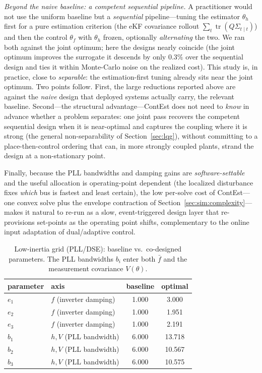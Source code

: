 \documentclass[twocolumn,amsthm]{autart}
\begin{document}
\emph{Beyond the naive baseline: a competent sequential pipeline.} A practitioner
would not use the uniform baseline but a \emph{sequential} pipeline---tuning the
estimator $\theta_h$ first for a pure estimation criterion (the eKF covariance
rollout $\sum_t\operatorname{tr}(Q\Sigma_{t\mid t})$) and then the control $\theta_f$
with $\theta_h$ frozen, optionally \emph{alternating} the two. We ran both against the
joint optimum; here the designs nearly coincide (the joint optimum improves the
surrogate it descends by only $0.3\%$ over the sequential design and ties it within
Monte-Carlo noise on the realized cost). This study is, in practice, close to
\emph{separable}: the estimation-first tuning already sits near the joint optimum. Two
points follow. First, the large reductions reported above are against the \emph{naive}
design that deployed systems actually carry, the relevant baseline. Second---the
structural advantage---ContEst does not need to \emph{know} in advance whether a
problem separates: one joint pass recovers the competent sequential design when it is
near-optimal and captures the coupling where it is strong (the general
non-separability of Section~\ref{sec:lqg}), without committing to a place-then-control
ordering that can, in more strongly coupled plants, strand the design at a
non-stationary point.

Finally, because the PLL bandwidths and damping gains are \emph{software-settable}
and the useful allocation is operating-point dependent (the localized disturbance
fixes \emph{which} bus is fastest and least certain), the low per-solve cost of
ContEst---one convex solve plus the envelope contraction of
Section~\ref{sec:sim:complexity}---makes it natural to re-run as a slow,
event-triggered design layer that re-provisions set-points as the operating point
shifts, complementary to the online input adaptation of dual/adaptive control.

\begin{table}[t]
\centering
\caption{Low-inertia grid (PLL/DSE): baseline vs.\ co-designed parameters. The
PLL bandwidths $b_i$ enter both $\bar f$ and the measurement covariance
$V(\theta)$.}
\label{tab:pll}
\begin{tabular}{llcc}
\hline
parameter & axis & baseline & optimal \\
\hline
$e_1$ & $f$ (inverter damping) & 1.000 & 3.000 \\
$e_2$ & $f$ (inverter damping) & 1.000 & 1.951 \\
$e_3$ & $f$ (inverter damping) & 1.000 & 2.191 \\
$b_1$ & $h,V$ (PLL bandwidth)  & 6.000 & 13.718 \\
$b_2$ & $h,V$ (PLL bandwidth)  & 6.000 & 10.567 \\
$b_3$ & $h,V$ (PLL bandwidth)  & 6.000 & 10.575 \\
\hline
\end{tabular}
\end{table}
\end{document}
